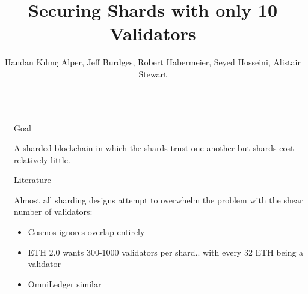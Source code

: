 \documentclass[final]{beamer}
\title{Securing Shards with only 10 Validators} %
\author{Handan Kılınç Alper, Jeff Burdges, Robert Habermeier, Seyed Hosseini, Alistair Stewart} %
\institute{Web 3.0 Foundation} %
\newlength{\sepwid}
\newlength{\onecolwid}
\begin{document}

\setlength{\belowcaptionskip}{2ex} %
\setlength\belowdisplayshortskip{2ex} %

\begin{frame}[t] %

\begin{columns}[t] %

\begin{column}{\sepwid}\end{column} %

\begin{column}{\onecolwid} %


\begin{alertblock}{Goal}

A sharded blockchain in which the shards trust one another but shards cost relatively little.

\end{alertblock}


\begin{block}{Literature}

Almost all sharding designs attempt to overwhelm the problem with the shear number of validators: \\
\begin{itemize}
\item Cosmos ignores overlap entirely
\item ETH 2.0 wants 300-1000 validators per shard..  with every 32 ETH being a validator
\item OmniLedger similar
\end{itemize}


\end{block}
\end{column}
\end{columns}
\end{frame}
\end{document}
